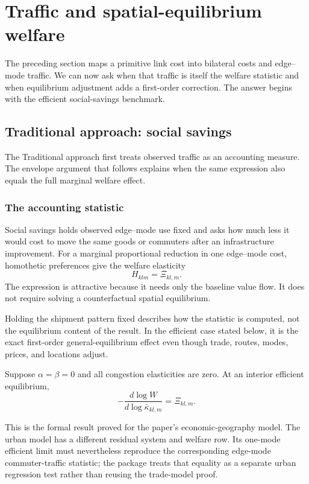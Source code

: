 \section{Traffic and spatial-equilibrium welfare}
\label{ch:welfare}

The preceding section maps a primitive link cost into bilateral costs and
edge--mode traffic. We can now ask when that traffic is itself the welfare
statistic and when equilibrium adjustment adds a first-order correction. The
answer begins with the efficient social-savings benchmark.

\subsection{Traditional approach: social savings}
\label{ch:hulten}

The Traditional approach first treats observed traffic as an accounting
measure. The envelope argument that follows explains when the same expression
also equals the full marginal welfare effect.

\subsubsection{The accounting statistic}

Social savings holds observed edge--mode use fixed and asks how much less it
would cost to move the same goods or commuters after an infrastructure
improvement. For a marginal proportional reduction in one edge--mode cost,
homothetic preferences give the welfare elasticity
\[
 H_{klm}=\Xi_{kl,m}.
\]
The expression is attractive because it needs only the baseline value flow.
It does not require solving a counterfactual spatial equilibrium.

Holding the shipment pattern fixed describes how the statistic is computed,
not the equilibrium content of the result. In the efficient case stated below,
it is the exact first-order general-equilibrium effect even though
trade, routes, modes, prices, and locations adjust.

\begin{proposition}
\label{prop:hulten}
Suppose \(\alpha=\beta=0\) and all congestion elasticities are zero. At an
interior efficient equilibrium,
\[
 -\frac{d\log W}{d\log\bar\kappa_{kl,m}}=\Xi_{kl,m}.
\]
\end{proposition}

This is the formal result proved for the paper's economic-geography model.
The urban model has a different residual system and welfare row. Its
one-mode efficient limit must nevertheless reproduce the corresponding
edge-mode commuter-traffic statistic; the package treats that equality as a
separate urban regression test rather than reusing the trade-model proof.

